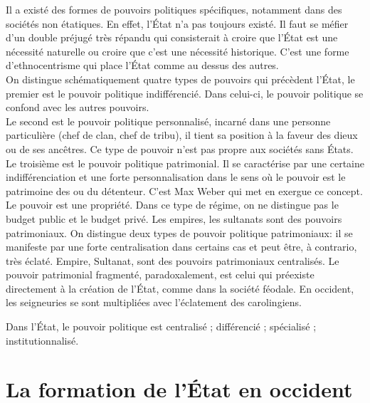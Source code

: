 \documentclass[10pt, a4paper, openany]{book}
\begin{document}
Il a existé des formes de pouvoirs politiques spécifiques, notamment dans des sociétés non étatiques. En effet, l'État n'a pas toujours existé. Il faut se méfier d'un double préjugé très répandu qui consisterait à croire que l'État est une nécessité naturelle ou croire que c'est une nécessité historique. C'est une forme d'ethnocentrisme qui place l'État comme au dessus des autres. \\
On distingue schématiquement quatre types de pouvoirs qui précèdent l'État, le premier est le pouvoir politique indifférencié. Dans celui-ci, le pouvoir politique se confond avec les autres pouvoirs. \\
Le second est le pouvoir politique personnalisé, incarné dans une personne particulière (chef de clan, chef de tribu), il tient sa position à la faveur des dieux ou de ses ancêtres. Ce type de pouvoir n'est pas propre aux sociétés sans États. \\
Le troisième est le pouvoir politique patrimonial. Il se caractérise par une certaine indifférenciation et une forte personnalisation dans le sens où le pouvoir est le patrimoine des ou du détenteur. C'est Max Weber qui met en exergue ce concept. Le pouvoir est une propriété. Dans ce type de régime, on ne distingue pas le budget public et le budget privé. Les empires, les sultanats sont des pouvoirs patrimoniaux. On distingue deux types de pouvoir politique patrimoniaux: il se manifeste par une forte centralisation dans certains cas et peut être, à contrario, très éclaté. Empire, Sultanat, sont des pouvoirs patrimoniaux centralisés. Le pouvoir patrimonial fragmenté, paradoxalement, est celui qui préexiste directement à la création de l'État, comme dans la société féodale. En occident, les seigneuries se sont multipliées avec l'éclatement des carolingiens. 


Dans l'État, le pouvoir politique est centralisé ; différencié ; spécialisé ; institutionnalisé. 


\chapter{La formation de l'État en occident}
\end{document}
